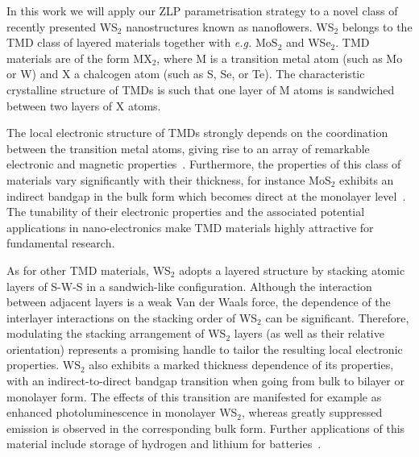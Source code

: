 In this work we will apply our ZLP parametrisation strategy
 to a novel class of recently presented WS$_2$ nanostructures known
as nanoflowers.
%
WS$_2$ belongs to the TMD class of layered materials together with {\it e.g.}
MoS$_2$ and WSe$_2$.
%
TMD materials are of the form MX$_2$, where M is a 
transition metal atom (such as Mo or W) and X a chalcogen atom (such as S, Se, or Te). 
%
The characteristic crystalline structure of TMDs is such that
one layer of M atoms is sandwiched between two layers of X atoms.

The local electronic structure of TMDs strongly depends on the coordination 
between the transition metal atoms, giving rise to an array of remarkable electronic
and magnetic properties~\cite{Chhowalla:2013}.
%
Furthermore, the properties of this class of materials vary significantly
with their thickness, for instance MoS$_2$ exhibits an indirect bandgap
in the bulk form which becomes direct at the monolayer level~\cite{Splendiani:2010}.
%
The tunability of their electronic properties and the associated
potential applications in nano-electronics make TMD materials highly attractive for fundamental research. 

As for other TMD materials, WS$_2$ adopts a layered structure 
by stacking atomic layers of S-W-S in a sandwich-like configuration. 
%
Although the interaction between adjacent layers is a weak Van der Waals 
force, the dependence of the interlayer interactions on the stacking 
order of WS$_2$ can be significant.
%
Therefore, modulating the stacking arrangement of WS$_2$ layers (as well
as their relative orientation)
represents a promising handle to tailor the resulting local electronic properties.
%
WS$_2$ also exhibits a marked thickness dependence of
its properties, with an indirect-to-direct bandgap transition when going
from bulk to bilayer or monolayer form.
%
The effects of this transition are manifested for example as enhanced
photoluminescence in monolayer WS$_2$, whereas greatly suppressed emission is observed in
the corresponding bulk form.
%
Further applications of this material include storage of hydrogen 
and lithium for batteries~\cite{Bhandavat:2012}.

